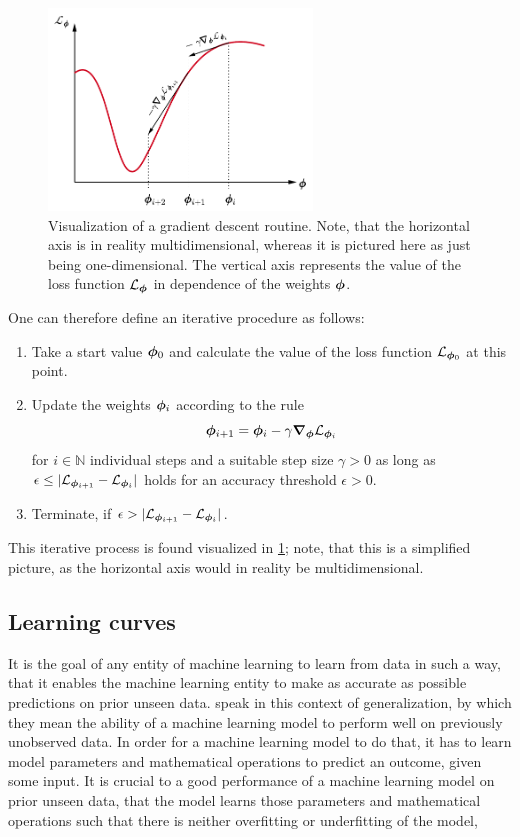 \documentclass[a4paper,12pt]{report}
\def\lk#1{{\color{black}{#1}}}
\begin{document}
\begin{figure}[h]
\centering
\includegraphics[width=7cm]{figures/gradientdescent.pdf}
\caption{Visualization of a gradient descent routine. Note, that the horizontal axis is in reality multidimensional, whereas it is pictured here as just being one-dimensional. The vertical axis represents the value of the loss function $\mathcal{L}_{\bm{\phi}}$ in dependence of the weights $\bm{\phi}$.}
\label{fig:gradientdescent}
\end{figure}
One can therefore define an iterative procedure as follows:
\begin{enumerate}
\item Take a start value $\bm{\phi}_0$ and calculate the value of the loss function $\mathcal{L}_{\bm{\phi}_0}$ at this point.
\item Update the weights $\bm{\phi}_{i}$ according to the rule \begin{equation}
\bm{\phi}_{i+1} = \bm{\phi}_{i} - \gamma \bm{\nabla}_{\bm{\phi}}\mathcal{L}_{\bm{\phi}_i}
\end{equation} for $i \in \mathbb{N}$ individual steps and a suitable step size $\gamma > 0$ as long as $\epsilon \leq |\mathcal{L}_{\bm{\phi}_{i+1}}-\mathcal{L}_{\bm{\phi}_{i}}|$ holds for an accuracy threshold $\epsilon > 0$.
\item Terminate, if $\epsilon > |\mathcal{L}_{\bm{\phi}_{i+1}}-\mathcal{L}_{\bm{\phi}_{i}}|$.
\end{enumerate}
This iterative process is found visualized in \cref{fig:gradientdescent}; note, that this is a simplified picture, as the horizontal axis would in reality be multidimensional.

\subsection{Learning curves}\label{sec:learningcurves}
It is the goal of any entity of machine learning to learn from data in such a way, that it enables the machine learning entity to make as accurate as possible predictions on prior unseen data. \cite[p.110]{Goodfellow.2016} speak in this context of generalization, by which they mean the ability of a machine learning model to perform well on previously unobserved data. In order for a machine learning model to do that, it has to learn model parameters and mathematical operations to predict an outcome, given some input. It is crucial to a good performance of a machine learning model on prior unseen data, that the model learns those parameters and mathematical operations such that there is neither overfitting or underfitting of the model, \lk{nor underrepresentation present in the training and testing data.}
\end{document}
